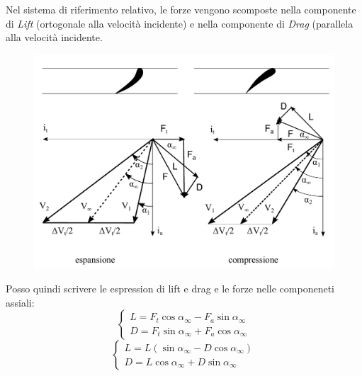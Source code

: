 Nel sistema di riferimento relativo, le forze vengono scomposte nella componente di \textit{Lift} (ortogonale alla velocità incidente) e nella componente di \textit{Drag} (parallela alla velocità incidente. 
\begin{figure}
\centering
  \includegraphics[width=.7\textwidth]{fig/triang1.pdf}
\caption{}
\label{fig:triang1}
\end{figure}
Posso quindi scrivere le espression di lift e drag e le forze nelle componeneti assiali:
\begin{equation}
	\begin{cases} 
		L = F_t \cos \alpha_{\infty} -  F_a \sin \alpha_{\infty}\\
		D = F_t \sin \alpha_{\infty} +  F_a \cos \alpha_{\infty}
	\end{cases}
\end{equation}
\begin{equation}
	\begin{cases} 
		L = L (\sin \alpha_{\infty} -  D \cos \alpha_{\infty})\\
		D = L \cos \alpha_{\infty} +  D \sin \alpha_{\infty}
	\end{cases}
\end{equation}

